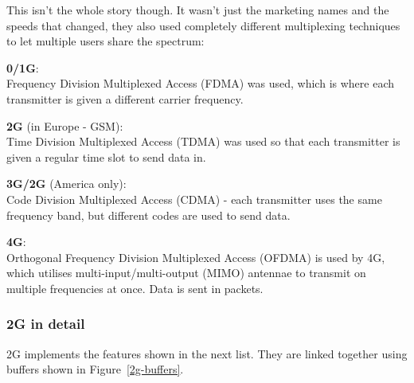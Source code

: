 This isn't the whole story though. It wasn't just the marketing names and the
speeds that changed, they also used completely different multiplexing techniques
to let multiple users share the spectrum:


\begin{description}
  \item \textbf{0/1G}:\\
    Frequency Division Multiplexed Access (FDMA) was used, which is where
    each transmitter is given a different carrier frequency.
  \item \textbf{2G} (in Europe - GSM):\\
    Time Division Multiplexed Access (TDMA) was used so that each transmitter
    is given a regular time slot to send data in.
  \item \textbf{3G/2G} (America only):\\
    Code Division Multiplexed Access (CDMA) - each transmitter uses the same
    frequency band, but different codes are used to send data.
  \item \textbf{4G}:\\
    Orthogonal Frequency Division Multiplexed Access (OFDMA) is used by 4G,
    which utilises multi-input/multi-output (MIMO) antennae to transmit on
    multiple frequencies at once. Data is sent in packets.
\end{description}

\subsubsection{2G in detail}

2G implements the features shown in the next list. They are linked together
using buffers shown in Figure~\ref{2g-buffers}.

